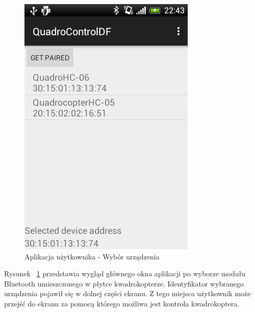 \begin{figure}[H]
	\centering
	\includegraphics[scale=0.6]{Pictures/DroidAtScreen/droid@screen-3.png}
	\caption[Aplikacja użytkownika - Ekran startory]{Aplikacja użytkownika - Wybór urządzenia}
	\label{fig:QuadroControl_screen3}
\end{figure}

Rysunek ~\ref{fig:QuadroControl_screen3} przedstawia wygląd głównego okna aplikacji po wyborze modułu Bluetooth umieszczonego w płytce kwadrokopterze. Identyfikator wybranego urządzenia pojawił się w dolnej części ekranu. Z tego miejsca użytkownik może przejść do ekranu za pomocą którego możliwa jest kontrola kwadrokoptera.


